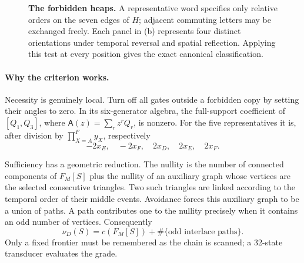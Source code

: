 \documentclass[10pt,letterpaper]{article}
\newcommand{\cA}{\mathsf A}
\begin{document}
\begin{figure}[t]
\caption{\textbf{The forbidden heaps.} A representative word specifies only relative orders on the seven edges of $H$; adjacent commuting letters may be exchanged freely. Each panel in (b) represents four distinct orientations under temporal reversal and spatial reflection. Applying this test at every position gives the exact canonical classification.}
\label{L:badfig}
\end{figure}

\paragraph{Why the criterion works.}
Necessity is genuinely local. Turn off all gates outside a forbidden copy by setting their angles to zero. In its six-generator algebra, the full-support coefficient of $[Q_1,Q_3]$, where $\cA(z)=\sum_r z^rQ_r$, is nonzero. For the five representatives it is, after division by $\prod_{X=A}^Fy_X$, respectively
\begin{equation}\label{L:obstruction}
 -2x_E,\quad-2x_F,\quad2x_D,\quad2x_E,\quad2x_F.
\end{equation}

Sufficiency has a geometric reduction. The nullity is the number of connected components of $F_M[S]$ plus the nullity of an auxiliary graph whose vertices are the selected consecutive triangles. Two such triangles are linked according to the temporal order of their middle events. Avoidance forces this auxiliary graph to be a union of paths. A path contributes one to the nullity precisely when it contains an odd number of vertices. Consequently
\begin{equation}\label{L:pathgrade}
 \nu_D(S)=c(F_M[S])+\#\{\text{odd interlace paths}\}.
\end{equation}
Only a fixed frontier must be remembered as the chain is scanned; a 32-state transducer evaluates the grade.
\end{document}
